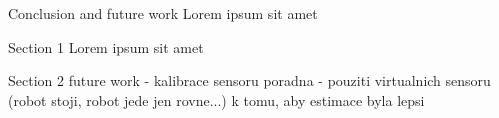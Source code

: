 \chap Conclusion and future work
Lorem ipsum sit amet

\sec Section 1
Lorem ipsum sit amet

\sec Section 2 future work
 - kalibrace sensoru poradna
 - pouziti virtualnich sensoru (robot stoji, robot jede jen rovne...) k tomu, aby estimace byla lepsi